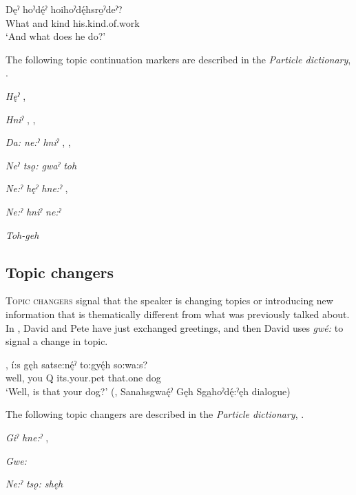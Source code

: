 \ea\label{ex:continuingtopic}
 \gll Dęˀ  hoˀdę́ˀ hoihoˀdę́hsro̱ˀdeˀ? \\
What and kind his.kind.of.work\\
\glt ‘And what does he do?’
\z

The following topic continuation markers are described in the \textit{Particle dictionary}, .

\begin{CayugaRelated}
\item{}\textit{Hęˀ} , \\
\item{}\textit{Hniˀ} , , \\
\item{}\textit{Da: ne:ˀ hniˀ} , , \\
\item{}\textit{Neˀ tsǫ: gwaˀ toh} \\
\item{}\textit{Ne:ˀ hęˀ hne:ˀ} , \\
\item{}\textit{Ne:ˀ hniˀ ne:ˀ} \\
\item{}\textit{Toh-geh} 
\end{CayugaRelated}



\subsection{Topic changers} \label{ch:Topic changers}
\textsc{Topic changers} signal that the speaker is changing topics or introducing new information that is thematically different from what was previously talked about. In , David and Pete have just exchanged greetings, and then David uses \textit{gwé:} to signal a change in topic. 

\ea\label{ex:changetopic}
 \gll {}, í:s gęh satse:nę́ˀ to:gyę́h so:wa:s?\\
well, you Q its.your.pet that.one dog\\
\glt ‘Well, is that your dog?’ (\cite[317]{mithun_watewayestanih_1984}, Sanahsgwaę́ˀ Gęh Sga̱hoˀdę́:ˀęh dialogue)
\z

The following topic changers are described in the \textit{Particle dictionary}, .

\begin{CayugaRelated}
\item{}\textit{Giˀ hne:ˀ} , \\
\item{}\textit{Gwe:} \\
\item{}\textit{Ne:ˀ tsǫ: shęh} 
\end{CayugaRelated}



